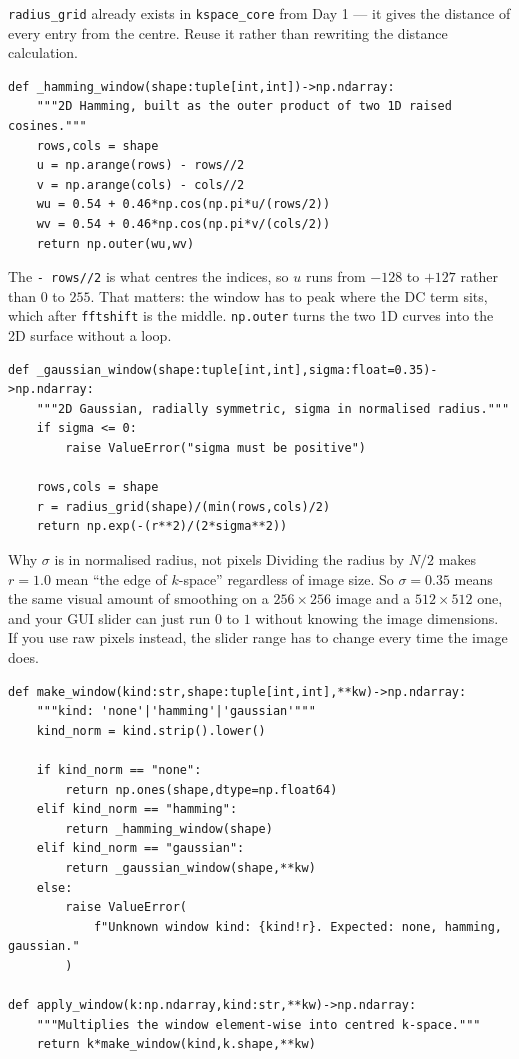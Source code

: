\documentclass[11pt,a4paper]{article}
\begin{document}
\texttt{radius\_grid} already exists in \texttt{kspace\_core} from Day 1 --- it
gives the distance of every entry from the centre. Reuse it rather than
rewriting the distance calculation.

\begin{lstlisting}
def _hamming_window(shape:tuple[int,int])->np.ndarray:
    """2D Hamming, built as the outer product of two 1D raised cosines."""
    rows,cols = shape
    u = np.arange(rows) - rows//2
    v = np.arange(cols) - cols//2
    wu = 0.54 + 0.46*np.cos(np.pi*u/(rows/2))
    wv = 0.54 + 0.46*np.cos(np.pi*v/(cols/2))
    return np.outer(wu,wv)
\end{lstlisting}

The \texttt{- rows//2} is what centres the indices, so $u$ runs from $-128$ to
$+127$ rather than $0$ to $255$. That matters: the window has to peak where the
DC term sits, which after \texttt{fftshift} is the middle. \texttt{np.outer}
turns the two 1D curves into the 2D surface without a loop.

\begin{lstlisting}
def _gaussian_window(shape:tuple[int,int],sigma:float=0.35)->np.ndarray:
    """2D Gaussian, radially symmetric, sigma in normalised radius."""
    if sigma <= 0:
        raise ValueError("sigma must be positive")

    rows,cols = shape
    r = radius_grid(shape)/(min(rows,cols)/2)
    return np.exp(-(r**2)/(2*sigma**2))
\end{lstlisting}

\begin{notebox}{Why $\sigma$ is in normalised radius, not pixels}
Dividing the radius by $N/2$ makes $r=1.0$ mean ``the edge of $k$-space''
regardless of image size. So $\sigma=0.35$ means the same visual amount of
smoothing on a $256\times256$ image and a $512\times512$ one, and your GUI slider
can just run $0$ to $1$ without knowing the image dimensions. If you use raw
pixels instead, the slider range has to change every time the image does.
\end{notebox}

\begin{lstlisting}
def make_window(kind:str,shape:tuple[int,int],**kw)->np.ndarray:
    """kind: 'none'|'hamming'|'gaussian'"""
    kind_norm = kind.strip().lower()

    if kind_norm == "none":
        return np.ones(shape,dtype=np.float64)
    elif kind_norm == "hamming":
        return _hamming_window(shape)
    elif kind_norm == "gaussian":
        return _gaussian_window(shape,**kw)
    else:
        raise ValueError(
            f"Unknown window kind: {kind!r}. Expected: none, hamming, gaussian."
        )

def apply_window(k:np.ndarray,kind:str,**kw)->np.ndarray:
    """Multiplies the window element-wise into centred k-space."""
    return k*make_window(kind,k.shape,**kw)
\end{lstlisting}
\end{document}
